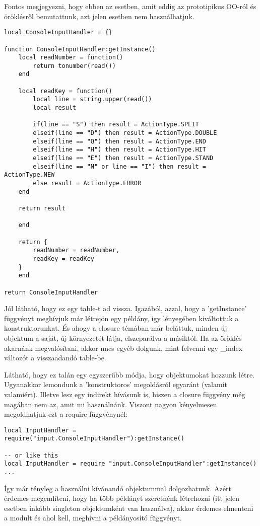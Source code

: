 Fontos megjegyezni, hogy ebben az esetben, amit eddig az prototipikus OO-ról és öröklésről bemutattunk, azt jelen esetben nem használhatjuk.
\scriptsize
\begin{lstlisting}
local ConsoleInputHandler = {}

function ConsoleInputHandler:getInstance()
	local readNumber = function()
		return tonumber(read())
	end
	
	local readKey = function()
		local line = string.upper(read())
		local result
		
		if(line == "S") then result = ActionType.SPLIT
		elseif(line == "D") then result = ActionType.DOUBLE
		elseif(line == "Q") then result = ActionType.END
		elseif(line == "H") then result = ActionType.HIT
		elseif(line == "E") then result = ActionType.STAND
		elseif(line == "N" or line == "I") then result = ActionType.NEW
		else result = ActionType.ERROR
	end
	
	return result
	
	end
	
	return {
		readNumber = readNumber,
		readKey = readKey
	}
	end

return ConsoleInputHandler
\end{lstlisting}
\normalsize
Jól látható, hogy ez egy table-t ad vissza. Igazából, azzal, hogy a 'getInstance' függvényt meghívjuk már létrejön egy példány, így lényegében kiváltottuk a konstruktorunkat. És ahogy a closure témában már beláttuk, minden új objektum a saját, új környezetét látja, elszeparálva a másiktól. Ha az öröklés akarnánk megvalósítani, akkor nncs egyéb dolgunk, mint felvenni egy \_index változót a visszaadandó table-be. 

Látható, hogy ez talán egy egyszerűbb módja, hogy objektumokat hozzunk létre. Ugyanakkor lemondunk a 'konstruktoros' megoldásról egyaránt (valamit valamiért). Illetve lesz egy indirekt hívásunk is, hiszen a closure függvény még magában nem az, amit mi használnánk. Viszont nagyon kényelmesen megoldhatjuk ezt a require függvénynél:
\scriptsize
\begin{lstlisting}
local InputHandler = require("input.ConsoleInputHandler"):getInstance()

-- or like this
local InputHandler = require "input.ConsoleInputHandler":getInstance()
...
\end{lstlisting}
\normalsize
Így már tényleg a használni kívánandó objektummal dolgozhatunk. Azért érdemes megemlíteni, hogy ha több példányt szeretnénk létrehozni (itt jelen esetben inkább singleton objektumként van használva), akkor érdemes elmenteni a modult és ahol kell, meghívni a példányosító függvényt.

